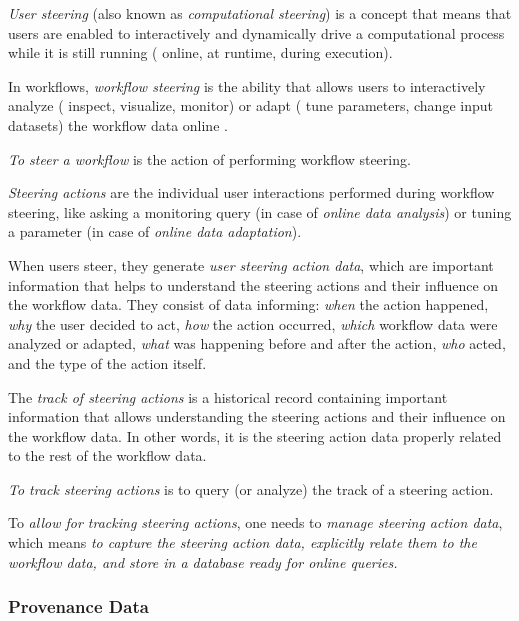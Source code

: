 \textit{User steering} (also known as \textit{computational steering}) is a concept that means that users are enabled to interactively and dynamically drive a computational process while it is still running (\ie{} online, at runtime, during execution).

In workflows, \textit{workflow steering} is the ability that allows users to interactively analyze (\eg{} inspect, visualize, monitor) or adapt (\eg{} tune parameters, change input datasets) the workflow data online \cite{Mattoso2015Dynamic}.

\textit{To steer a workflow} is the action of performing workflow steering.

\textit{Steering actions}
are the individual user interactions performed during workflow steering, like asking a monitoring query (in case of \textit{online data analysis}) or tuning a parameter (in case of \textit{online data adaptation}).

When users steer, they generate \textit{user steering action data}, which are important information that helps to understand the steering actions and their influence on the workflow data. They consist of data informing: \textit{when} the action happened, \textit{why} the user decided to act, \textit{how} the action occurred, \textit{which} workflow data were analyzed or adapted, \textit{what} was happening before and after the action, \textit{who} acted, and the type of the action itself.

The \textit{track of steering actions} is a historical record containing important information that allows understanding the steering actions and their influence on the workflow data. In other words, it is the steering action data properly related to the rest of the workflow data.

\textit{To track steering actions}
is to query (or analyze) the track of a steering action.

To \textit{allow for tracking steering actions}, one needs to \textit{manage steering action data}, which means \textit{to capture the steering action data, explicitly relate them to the workflow data, and store in a database ready for online queries.}


\subsubsection{Provenance Data}

